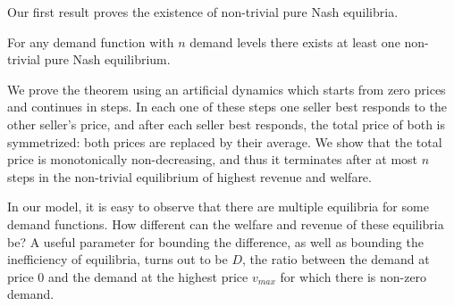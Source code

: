 Our first result proves the existence of non-trivial pure Nash equilibria.

\begin{theorem}
	For any demand function with $n$ demand levels there exists at least one non-trivial pure Nash equilibrium.
\end{theorem}
We prove the theorem using an artificial dynamics which starts from zero prices and continues in steps.
In each one of these steps one seller best responds to the other seller's price, %
and after each seller best responds, the total price of both is symmetrized: both prices are replaced by their average.
We show that %
	the total price is monotonically non-decreasing, and thus it
terminates after at most $n$ steps in the non-trivial equilibrium of highest revenue and welfare.

In our model, it is easy to observe that there are multiple equilibria for some demand functions. How different can the welfare and revenue of these equilibria be?
A useful parameter for bounding the difference, as well as bounding the inefficiency of equilibria, turns out to be $D$,
the ratio between the demand at price $0$ and the demand at the highest price $v_{max}$
for which there is non-zero demand. %

